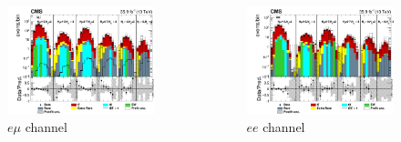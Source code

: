 \documentclass{beamer}
\begin{document}
\begin{frame}
\begin{columns}
\begin{figure}
		\includegraphics[width=\linewidth]{hist_muel_log.png}
		\caption{$e\mu$ channel}
	\end{figure}
	\begin{figure}
		\includegraphics[width=\linewidth]{hist_elel_log.png}
		\caption{$ee$ channel}
	\end{figure}
\end{columns}
\end{frame}

\end{document}
